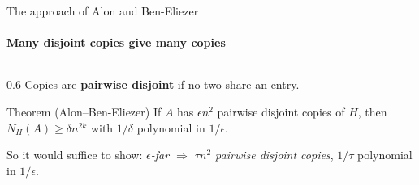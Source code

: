 \documentclass[aspectratio=169,11pt,t]{beamer}
\begin{document}
\begin{frame}{The approach of Alon and Ben-Eliezer}
\framesubtitle{Many disjoint copies give many copies}
\begin{columns}[T]
\begin{column}{0.6\textwidth}
Copies are \textbf{pairwise disjoint} if no two share an entry.

\begin{block}{Theorem (Alon--Ben-Eliezer)}
If $A$ has $\epsilon n^2$ pairwise disjoint copies of $H$,
then $N_H(A)\ge\delta n^{2k}$ with $1/\delta$ polynomial in $1/\epsilon$.
\end{block}

So it would suffice to show: \emph{$\epsilon$-far $\Rightarrow$ $\tau n^2$ pairwise disjoint copies},
$1/\tau$ polynomial in $1/\epsilon$.


\end{column}
\end{columns}
\end{frame}
\end{document}
